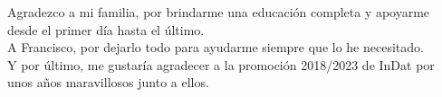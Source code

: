 
Agradezco a mi familia, por brindarme una educación completa y apoyarme desde el primer día hasta el último.\\

A Francisco, por dejarlo todo para ayudarme siempre que lo he necesitado.\\

Y por último, me gustaría agradecer a la promoción 2018/2023 de InDat por unos años maravillosos junto a ellos.